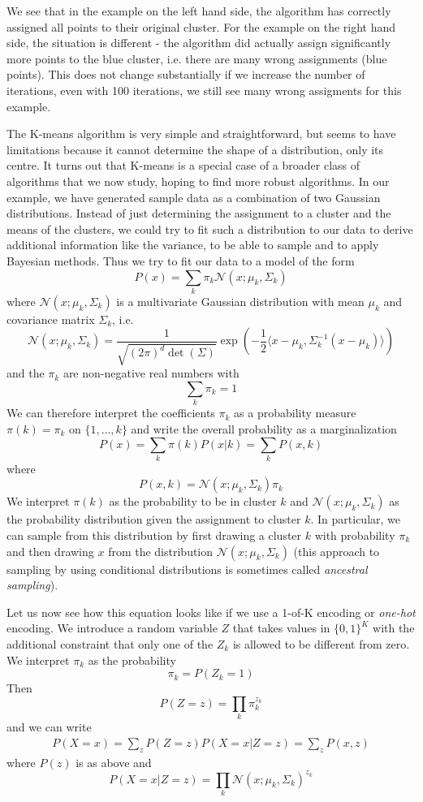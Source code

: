 \documentclass[a4paper, draft]{article}
\theoremstyle{own}
\theoremstyle{remark}
\begin{document}
We see that in the example on the left hand side, the algorithm has correctly assigned all points to their original cluster. For the example on the right hand side, the situation is different - the algorithm did actually assign significantly more points to the blue cluster, i.e. there are many wrong assignments (blue points). This does not change substantially if we increase the number of iterations, even with 100 iterations, we still see many wrong assigments for this example.

The K-means algorithm is very simple and straightforward, but seems to have limitations because it cannot determine the shape of a distribution, only its centre. It turns out that K-means is a special case of a broader class of algorithms that we now study, hoping to find more robust algorithms. In our example, we have generated sample data as a combination of two Gaussian distributions. Instead of just determining the assignment to a cluster and the means of the clusters, we could try to fit such a distribution to our data to derive additional information like the variance, to be able to sample and to apply Bayesian methods. Thus we try to fit our data to a model of the form
$$
P(x) = \sum_k \pi_k {\mathcal N}(x ; \mu_k, \Sigma_k)
$$
where ${\mathcal N}(x ; \mu_k, \Sigma_k)$ is a multivariate Gaussian distribution
with mean $\mu_k$ and covariance matrix $\Sigma_k$, i.e.
$$
{\mathcal N}(x ; \mu_k, \Sigma_k) = \frac{1}{\sqrt{(2\pi)^d \det(\Sigma)}}
\exp (-\frac{1}{2} \langle x - \mu_k, \Sigma_k^{-1}(x - \mu_k)\rangle)
$$
and the $\pi_k$ are non-negative real numbers with 
$$
\sum_k \pi_k = 1
$$
We can therefore interpret the coefficients $\pi_k$ as a probability measure $\pi(k) = \pi_k$ on $\{1, \dots, k\}$ and write the overall probability as a marginalization
$$
P(x) = \sum_k \pi(k) P(x | k) = \sum_k P(x,k)
$$
where 
$$
P(x , k) = {\mathcal N}(x ; \mu_k, \Sigma_k) \pi_k
$$
We interpret $\pi(k)$ as the probability to be in cluster $k$ and ${\mathcal N}(x ; \mu_k, \Sigma_k)$ as the probability distribution given the assignment to cluster $k$. In particular, we can sample from this distribution by first drawing a cluster $k$ with probability $\pi_k$ and then drawing $x$ from the distribution ${\mathcal N}(x ; \mu_k, \Sigma_k)$ (this approach to sampling by using conditional distributions is sometimes called {\em ancestral sampling}).

Let us now see how this equation looks like if we use a 1-of-K encoding or {\em one-hot} encoding. We introduce a random variable $Z$ that takes values in $\{ 0, 1\}^K$ with the additional constraint that only one of the $Z_k$ is allowed to be different from zero. We interpret $\pi_k$ as the probability 
$$
\pi_k = P(Z_k = 1)
$$
Then
$$
P(Z = z) = \prod_k \pi_k ^{z_k}
$$
and we can write
\begin{align}\label{eq:latentmodeljointdistribution}
P(X=x) = \sum_z P(Z=z) P(X=x | Z=z) = \sum_z P(x,z)
\end{align}
where $P(z)$ is as above and
$$
P(X = x | Z = z) = \prod_k {\mathcal N}(x ; \mu_k, \Sigma_k)^{z_k}
$$
\end{document}
